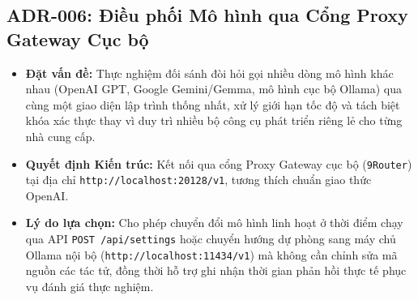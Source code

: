 \subsection{ADR-006: Điều phối Mô hình qua Cổng Proxy Gateway Cục bộ}
\begin{itemize}[leftmargin=1.5cm]
    \item \textbf{Đặt vấn đề:} Thực nghiệm đối sánh đòi hỏi gọi nhiều dòng mô hình khác nhau (OpenAI GPT, Google Gemini/Gemma, mô hình cục bộ Ollama) qua cùng một giao diện lập trình thống nhất, xử lý giới hạn tốc độ và tách biệt khóa xác thực thay vì duy trì nhiều bộ công cụ phát triển riêng lẻ cho từng nhà cung cấp.
    \item \textbf{Quyết định Kiến trúc:} Kết nối qua cổng Proxy Gateway cục bộ (\texttt{9Router}) tại địa chỉ \texttt{http://localhost:20128/v1}, tương thích chuẩn giao thức OpenAI.
    \item \textbf{Lý do lựa chọn:} Cho phép chuyển đổi mô hình linh hoạt ở thời điểm chạy qua API \texttt{POST /api/settings} hoặc chuyển hướng dự phòng sang máy chủ Ollama nội bộ (\texttt{http://localhost:11434/v1}) mà không cần chỉnh sửa mã nguồn các tác tử, đồng thời hỗ trợ ghi nhận thời gian phản hồi thực tế phục vụ đánh giá thực nghiệm.
\end{itemize}


